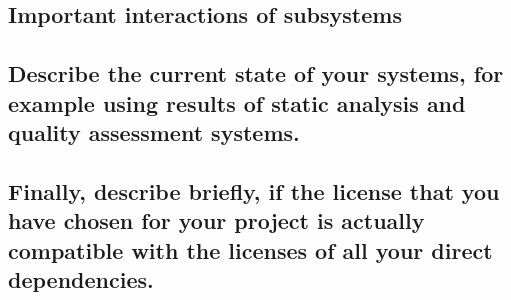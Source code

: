 \subsection{Important interactions of subsystems}
\subsection{Describe the current state of your systems, for example using results of static analysis and quality assessment systems.}
\subsection{Finally, describe briefly, if the license that you have chosen for your project is actually compatible with the licenses of all your direct dependencies.}